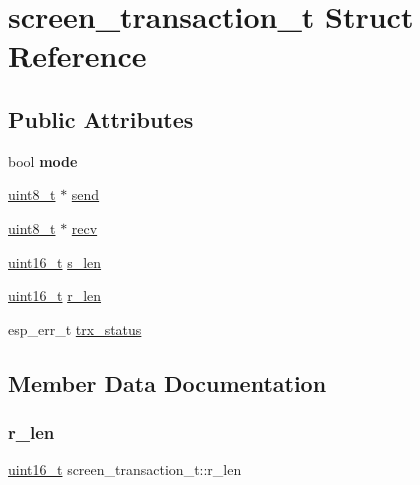 \hypertarget{structscreen__transaction__t}{}\section{screen\+\_\+transaction\+\_\+t Struct Reference}
\label{structscreen__transaction__t}
\subsection*{Public Attributes}
\begin{DoxyCompactItemize}
\item 
\mbox{\label{structscreen__transaction__t_af29c3c70326c33692c8f1aab31170093}} 
bool {\bfseries mode}
\item 
\hyperlink{vl53l0x__types_8h_aba7bc1797add20fe3efdf37ced1182c5}{uint8\+\_\+t} $\ast$ \hyperlink{structscreen__transaction__t_ad61b850a61304532df31ac1699b71911}{send}
\item 
\hyperlink{vl53l0x__types_8h_aba7bc1797add20fe3efdf37ced1182c5}{uint8\+\_\+t} $\ast$ \hyperlink{structscreen__transaction__t_ac00eeb10dbec656aeb6d4cd81bc4533c}{recv}
\item 
\hyperlink{vl53l0x__types_8h_a273cf69d639a59973b6019625df33e30}{uint16\+\_\+t} \hyperlink{structscreen__transaction__t_ade485ce9cfd695b682aa0827ef8dd8ce}{s\+\_\+len}
\item 
\hyperlink{vl53l0x__types_8h_a273cf69d639a59973b6019625df33e30}{uint16\+\_\+t} \hyperlink{structscreen__transaction__t_a5f7bed33270626b40a9e44bbdc73c7e0}{r\+\_\+len}
\item 
esp\+\_\+err\+\_\+t \hyperlink{structscreen__transaction__t_a1ee2e2ae378bc746fb656a0d5ec31d8b}{trx\+\_\+status}
\end{DoxyCompactItemize}


\subsection{Member Data Documentation}
\mbox{\label{structscreen__transaction__t_a5f7bed33270626b40a9e44bbdc73c7e0}} 
\subsubsection{\texorpdfstring{r\+\_\+len}{r\_len}}
{\footnotesize\ttfamily \hyperlink{vl53l0x__types_8h_a273cf69d639a59973b6019625df33e30}{uint16\+\_\+t} screen\+\_\+transaction\+\_\+t\+::r\+\_\+len}

